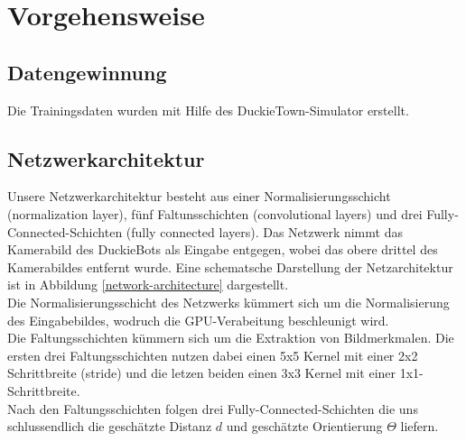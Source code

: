 
\chapter{Vorgehensweise}

\section{Datengewinnung}

Die Trainingsdaten wurden mit Hilfe des DuckieTown-Simulator erstellt.

\section{Netzwerkarchitektur}

Unsere Netzwerkarchitektur besteht aus einer Normalisierungsschicht (normalization layer), fünf Faltunsschichten (convolutional layers) und drei Fully-Connected-Schichten (fully connected layers). Das Netzwerk nimmt das  Kamerabild des DuckieBots als Eingabe entgegen, wobei das obere drittel des Kamerabildes entfernt wurde. Eine schematsche Darstellung der Netzarchitektur ist in Abbildung \ref{network-architecture} dargestellt. \\

Die Normalisierungsschicht des Netzwerks kümmert sich um die Normalisierung des Eingabebildes, wodruch die GPU-Verabeitung beschleunigt wird. \\

Die Faltungsschichten kümmern sich um die Extraktion von Bildmerkmalen. Die ersten drei Faltungsschichten nutzen dabei einen 5x5 Kernel mit einer 2x2 Schrittbreite (stride) und die letzen beiden einen 3x3 Kernel mit einer 1x1-Schrittbreite. \\

Nach den Faltungsschichten folgen drei Fully-Connected-Schichten die uns schlussendlich die geschätzte Distanz $d$ und geschätzte Orientierung $\Theta$ liefern.


